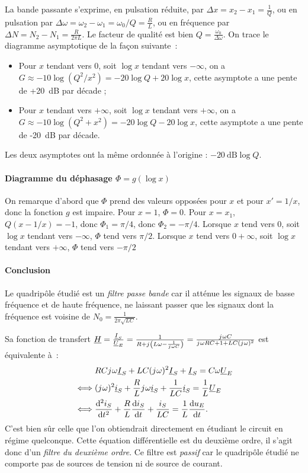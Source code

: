 La bande passante s'exprime, en pulsation réduite, par $\Delta x = x_2 - x_1 = \frac{1}{Q}$, ou en pulsation par $\Delta \omega = \omega_2 - \omega_1 = \omega_0/Q = \frac{R}{L}$, ou en fréquence par $\Delta N = N_2- N_1 = \frac{R}{2\pi L}$. Le facteur de qualité est bien $Q = \frac{\omega_0}{\Delta \omega}$. On trace le diagramme asymptotique de la façon suivante~:
\begin{itemize}
	\item Pour $x$ tendant vers $0$, soit $\log x$ tendant vers $-\infty$, on a $G \approx -10\log(Q^2/x^2) = -20\log Q +20\log x$, cette asymptote a une pente de +\SI{20}{\dB} par décade ;
	\item Pour $x$ tendant vers $+\infty$, soit $\log x$ tendant vers $+\infty$, on a $G \approx -10\log(Q^2+x^2) = -20\log Q -20\log x$, cette asymptote a une pente de -\SI{20}{\dB} par décade.
\end{itemize}
Les deux asymptotes ont la même ordonnée à l'origine : $-\SI{20}{\dB}\log Q$.
\paragraph{Diagramme du déphasage $\Phi = g(\log x)$}

On remarque d'abord que $\Phi$ prend des valeurs opposées pour $x$ et pour $x'=1/x$, donc la fonction $g$ est impaire. Pour $x=1$, $\Phi = 0$. Pour $x=x_1$, $Q(x-1/x)=-1$, donc $\Phi_1=\pi/4$, donc $\Phi_2=-\pi/4$. Lorsque $x$ tend vers $0$, soit $\log x$ tendant vers $-\infty$, $\Phi$ tend vers $\pi/2$. Lorsque $x$ tend vers $0+\infty$, soit $\log x$ tendant vers $+\infty$, $\Phi$ tend vers $-\pi/2$
\paragraph{Conclusion}

Le quadripôle étudié est un \emph{filtre passe bande} car il atténue les signaux de basse fréquence et de haute fréquence, ne laissant passer que les signaux dont la fréquence est voisine de $N_0 = \frac{1}{2\pi\sqrt{LC}}$.

Sa fonction de transfert $\underline{H} = \frac{\underline{I}_S}{\underline{U}_E} = \frac{1}{R+{j\mkern1mu}\left( L\omega -\frac{1}{{j\mkern1mu} \omega C} \right)} = \frac{{j\mkern1mu} \omega C}{{j\mkern1mu} \omega R C + 1 +LC ({j\mkern1mu} \omega)^2}$ est équivalente à~:
\begin{align}
	& RC {j\mkern1mu} \omega \underline{I}_S + LC ({j\mkern1mu} \omega)^2 \underline{I}_S + \underline{I}_S = C \omega \underline{U}_E \\
	\iff & ({j\mkern1mu} \omega)^2 \underline{i}_S + \frac{R}{L} {j\mkern1mu}\omega \underline{i}_S + \frac{1}{LC} \underline{i}_S = \frac{1}{L} \underline{U}_E \\
	\iff & \dfrac{\mathrm{d}^2 i_S}{\mathrm{d} {t}^2} + \frac{R}{L} \dfrac{\mathrm{d} i_S}{\mathrm{d} t} + \frac{i_S}{LC} = \frac{1}{L} \dfrac{\mathrm{d} u_E}{\mathrm{d} t}.
\end{align}
C'est bien sûr celle que l'on obtiendrait directement en étudiant le circuit en régime quelconque. Cette équation différentielle est du deuxième ordre, il s'agit donc d'un \emph{filtre du deuxième ordre}. Ce filtre est \emph{passif} car le quadripôle étudié ne comporte pas de sources de tension ni de source de courant.


